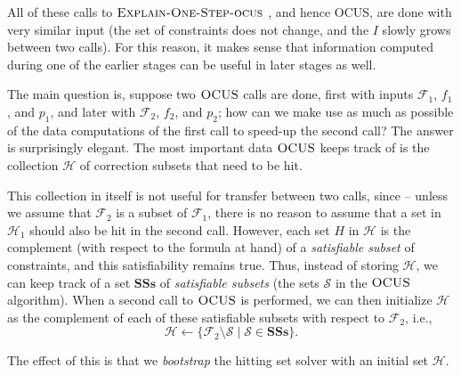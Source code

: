 \documentclass[twoside,11pt]{article}
\newcommand\m[1]{\mathcal{#1}}
\newcommand\setstohit{\ensuremath{\m{H} }\xspace}
\newcommand\formula{\ensuremath{\m{F} }\xspace}
\newcommand\mm[1]{\ensuremath{#1}\xspace}
\newcommand\call[1]{\mm{\textsc{#1}}}
\newcommand\comus{\mm{\call{OCUS}}}
\newcommand\satsets{\mm{\mathbf{SSs}}}
\newcommand\onestepo{\ensuremath{\call{Explain-One-Step-ocus}} \xspace}
\begin{document}
All of these calls to \onestepo, and hence OCUS, are done with very similar input (the set of constraints does not change, and the $I$ slowly grows between two calls). For this reason, it makes sense that information computed during one of the earlier stages can be useful in later stages as well. 

The main question is, suppose two \comus calls are done, first with inputs $\formula_1$, $f_1$, and $p_1$, and later with $\formula_2$, $f_2$, and $p_2$; how can we make use as much as possible of the data computations of the first call to speed-up the second call? The answer is surprisingly elegant. The most important data \comus keeps track of  is the collection \setstohit of correction subsets that need to be hit.

This collection in itself is not useful for transfer between two calls, since -- unless we assume that $\formula_2$ is a subset of $\formula_1$, there is no reason to assume that a set in $\setstohit_1$ should also be hit in the second call. 
However, each set $H$ in $\setstohit$ is the complement (with respect to the formula at hand) of a \emph{satisfiable subset} of constraints, and this satisfiability remains true. 
Thus, instead of storing $\setstohit$, we can keep track of a set \satsets of \emph{satisfiable subsets} (the sets $\m{S}$ in the \comus algorithm). 
When a second call to \comus is performed, we can then initialize $\setstohit$ as the complement of each of these satisfiable subsets with respect to $\formula_2$, i.e., \[\setstohit\gets \{\formula_2\setminus \m{S}\mid \m{S}\in \satsets\}.\]

The effect of this is that we \textit{bootstrap} the hitting set solver with an initial set $\setstohit$.
\end{document}
